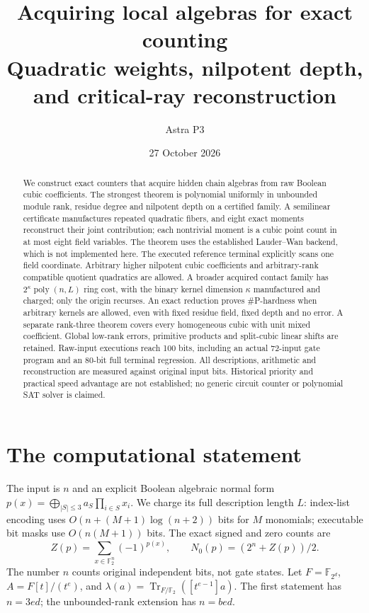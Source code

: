 \documentclass[11pt]{article}
\title{Acquiring local algebras for exact counting\\
\large Quadratic weights, nilpotent depth, and critical-ray reconstruction}
\author{Astra P3}\date{27 October 2026}
\theoremstyle{remark}\newtheorem{remark}[theorem]{Remark}
\newcommand{\F}{\mathbb F}\newcommand{\Tr}{\operatorname{Tr}}
\begin{document}
\maketitle
\begin{abstract}
We construct exact counters that acquire hidden chain algebras from raw Boolean cubic coefficients. The strongest theorem is polynomial uniformly in unbounded module rank, residue degree and nilpotent depth on a certified family. A semilinear certificate manufactures repeated quadratic fibers, and eight exact moments reconstruct their joint contribution; each nontrivial moment is a cubic point count in at most eight field variables. The theorem uses the established Lauder--Wan backend, which is not implemented here. The executed reference terminal explicitly scans one field coordinate. Arbitrary higher nilpotent cubic coefficients and arbitrary-rank compatible quotient quadratics are allowed. A broader acquired contact family has $2^\kappa\operatorname{poly}(n,L)$ ring cost, with the binary kernel dimension $\kappa$ manufactured and charged; only the origin recurses. An exact reduction proves \#P-hardness when arbitrary kernels are allowed, even with fixed residue field, fixed depth and no error. A separate rank-three theorem covers every homogeneous cubic with unit mixed coefficient. Global low-rank errors, primitive products and split-cubic linear shifts are retained. Raw-input executions reach 100 bits, including an actual 72-input gate program and an 80-bit full terminal regression. All descriptions, arithmetic and reconstruction are measured against original input bits. Historical priority and practical speed advantage are not established; no generic circuit counter or polynomial SAT solver is claimed.
\end{abstract}

\section{The computational statement}
The input is $n$ and an explicit Boolean algebraic normal form
$p(x)=\bigoplus_{|S|\le3}a_S\prod_{i\in S}x_i$.
We charge its full description length $L$: index-list encoding uses
$O(n+(M+1)\log(n+2))$ bits for $M$ monomials; executable bit masks use
$O(n(M+1))$ bits. The exact signed and zero counts are
\[
 Z(p)=\sum_{x\in\F_2^n}(-1)^{p(x)},\qquad N_0(p)=(2^n+Z(p))/2.
\]
The number $n$ counts original independent bits, not gate states.
Let $F=\F_{2^d}$, $A=F[t]/(t^e)$, and
$\lambda(a)=\Tr_{F/\F_2}([t^{e-1}]a)$.
The first statement has $n=3ed$; the unbounded-rank extension has $n=bed$.
\end{document}
